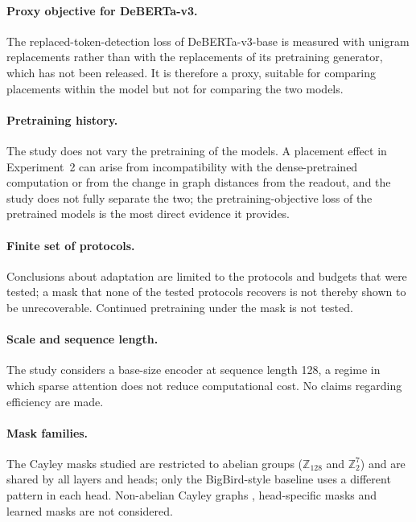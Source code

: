 \documentclass[10pt]{article}
\newcommand{\Z}{\mathbb{Z}}
\begin{document}
\paragraph{Proxy objective for DeBERTa-v3.} The replaced-token-detection loss of DeBERTa-v3-base is measured with unigram replacements rather than with the replacements of its pretraining generator, which has not been released. It is therefore a proxy, suitable for comparing placements within the model but not for comparing the two models.

\paragraph{Pretraining history.} The study does not vary the pretraining of the models. A placement effect in Experiment~2 can arise from incompatibility with the dense-pretrained computation or from the change in graph distances from the readout, and the study does not fully separate the two; the pretraining-objective loss of the pretrained models is the most direct evidence it provides.

\paragraph{Finite set of protocols.} Conclusions about adaptation are limited to the protocols and budgets that were tested; a mask that none of the tested protocols recovers is not thereby shown to be unrecoverable. Continued pretraining under the mask is not tested.

\paragraph{Scale and sequence length.} The study considers a base-size encoder at sequence length 128, a regime in which sparse attention does not reduce computational cost. No claims regarding efficiency are made.

\paragraph{Mask families.} The Cayley masks studied are restricted to abelian groups ($\Z_{128}$ and $\Z_2^7$) and are shared by all layers and heads; only the BigBird-style baseline uses a different pattern in each head. Non-abelian Cayley graphs \citep{wilson2025cayley}, head-specific masks and learned masks \citep{shi2021sparsebert,xiao2024duoattention} are not considered.
\end{document}
